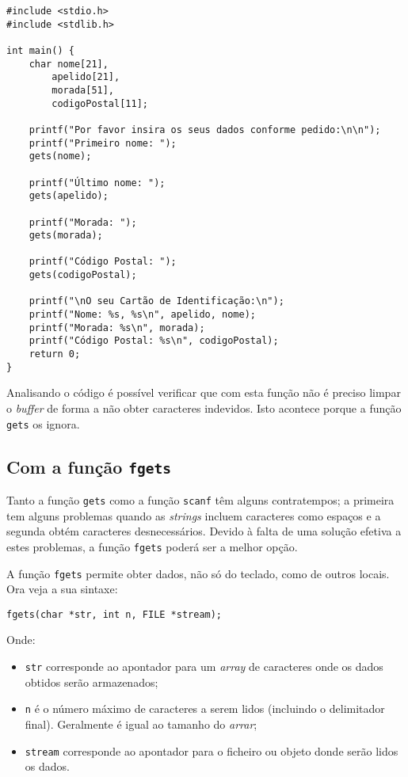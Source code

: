 \begin{lstlisting}
#include <stdio.h>
#include <stdlib.h>
 
int main() {
    char nome[21],
        apelido[21],
        morada[51],
        codigoPostal[11];
 
    printf("Por favor insira os seus dados conforme pedido:\n\n");
    printf("Primeiro nome: ");
    gets(nome);
 
    printf("Último nome: ");
    gets(apelido);
 
    printf("Morada: ");
    gets(morada);
 
    printf("Código Postal: ");
    gets(codigoPostal);
 
    printf("\nO seu Cartão de Identificação:\n");
    printf("Nome: %s, %s\n", apelido, nome);
    printf("Morada: %s\n", morada);
    printf("Código Postal: %s\n", codigoPostal);
    return 0;
}
\end{lstlisting}

Analisando o código é possível verificar que com esta função não é preciso limpar o \textit{buffer} de forma a não obter caracteres indevidos. Isto acontece porque a função \texttt{gets} os ignora.

\subsection{Com a função \texttt{fgets}}

Tanto a função \texttt{gets} como a função \texttt{scanf} têm alguns contratempos; a primeira tem alguns problemas quando as \textit{strings} incluem caracteres como espaços e a segunda obtém caracteres desnecessários. Devido à falta de uma solução efetiva a estes problemas, a função \texttt{fgets} poderá ser a melhor opção.

A função \texttt{fgets} permite obter dados, não só do teclado, como de outros locais. Ora veja a sua sintaxe:

\begin{lstlisting}
fgets(char *str, int n, FILE *stream);
\end{lstlisting}

Onde:

\begin{itemize}
\item \texttt{str} corresponde ao apontador para um \textit{array} de caracteres onde os dados obtidos serão armazenados;
\item \texttt{n} é o número máximo de caracteres a serem lidos (incluindo o delimitador final). Geralmente é igual ao tamanho do \textit{arrar};
\item \texttt{stream} corresponde ao apontador para o ficheiro ou objeto donde serão lidos os dados.
\end{itemize}

